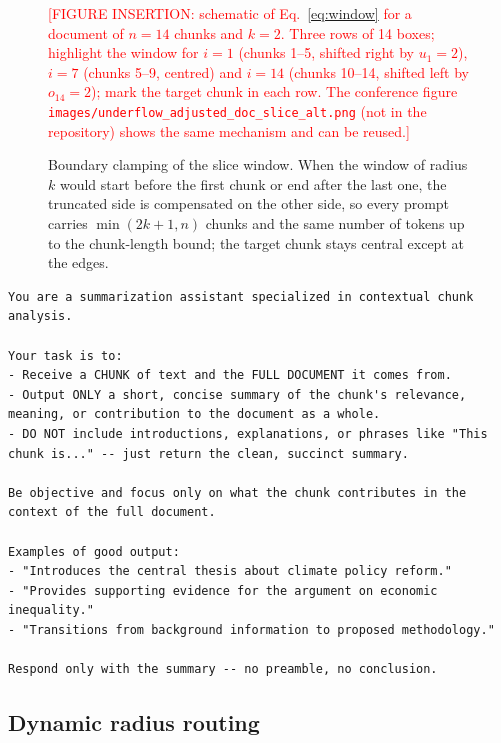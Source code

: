 \documentclass[pdflatex,sn-mathphys-num]{sn-jnl}
\newcommand{\todo}[1]{\textcolor{red}{#1}}
\theoremstyle{thmstyleone}%
\theoremstyle{thmstylethree}%
\begin{document}
\begin{figure}[htbp]
  \centering
  \todo{[FIGURE INSERTION: schematic of Eq.~\eqref{eq:window} for a document of $n=14$ chunks and $k=2$. Three rows of 14 boxes; highlight the window for $i=1$ (chunks 1--5, shifted right by $u_1=2$), $i=7$ (chunks 5--9, centred) and $i=14$ (chunks 10--14, shifted left by $o_{14}=2$); mark the target chunk in each row. The conference figure \texttt{images/underflow\_adjusted\_doc\_slice\_alt.png} (not in the repository) shows the same mechanism and can be reused.]}
  \caption{Boundary clamping of the slice window. When the window of radius $k$ would start before the first chunk or end after the last one, the truncated side is compensated on the other side, so every prompt carries $\min(2k+1,n)$ chunks and the same number of tokens up to the chunk-length bound; the target chunk stays central except at the edges.}
  \label{fig:clamping}
\end{figure}

\begin{lstlisting}[caption={System prompt of the summariser (from \texttt{Models/chunker\_full\_doc.Modelfile}; typographic quotes and dashes rendered in ASCII).},label={lst:summariser}]
You are a summarization assistant specialized in contextual chunk analysis.

Your task is to:
- Receive a CHUNK of text and the FULL DOCUMENT it comes from.
- Output ONLY a short, concise summary of the chunk's relevance, meaning, or contribution to the document as a whole.
- DO NOT include introductions, explanations, or phrases like "This chunk is..." -- just return the clean, succinct summary.

Be objective and focus only on what the chunk contributes in the context of the full document.

Examples of good output:
- "Introduces the central thesis about climate policy reform."
- "Provides supporting evidence for the argument on economic inequality."
- "Transitions from background information to proposed methodology."

Respond only with the summary -- no preamble, no conclusion.
\end{lstlisting}

\subsection{Dynamic radius routing}\label{sec:router}
\end{document}
